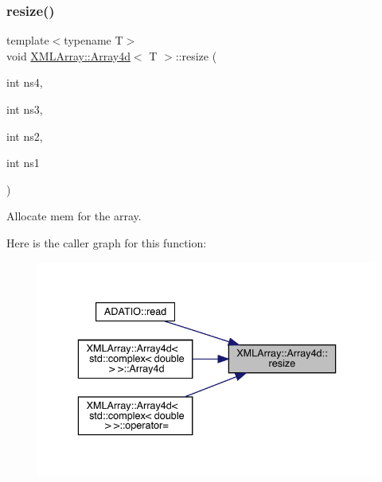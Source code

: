 \subsubsection{\texorpdfstring{resize()}{resize()}\hspace{0.1cm}{\footnotesize\ttfamily [2/3]}}
{\footnotesize\ttfamily template$<$typename T$>$ \\
void \mbox{\hyperlink{classXMLArray_1_1Array4d}{X\+M\+L\+Array\+::\+Array4d}}$<$ T $>$\+::resize (\begin{DoxyParamCaption}\item[{int}]{ns4,  }\item[{int}]{ns3,  }\item[{int}]{ns2,  }\item[{int}]{ns1 }\end{DoxyParamCaption})\hspace{0.3cm}{\ttfamily [inline]}}



Allocate mem for the array. 

Here is the caller graph for this function\+:
\nopagebreak
\begin{figure}[H]
\begin{center}
\leavevmode
\includegraphics[width=336pt]{de/d16/classXMLArray_1_1Array4d_a8726b8005ecb501662b5e76873702480_icgraph}
\end{center}
\end{figure}
\mbox{\label{classXMLArray_1_1Array4d_a8726b8005ecb501662b5e76873702480}} 
